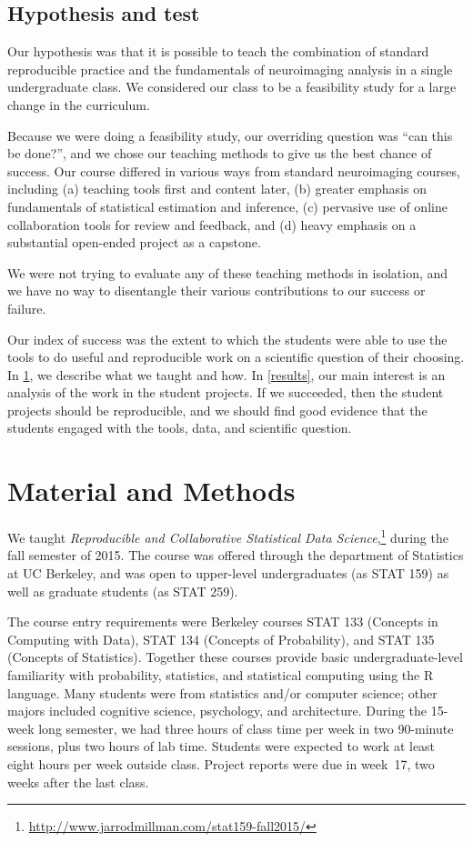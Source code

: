 \subsection{Hypothesis and test}

Our hypothesis was that it is possible to teach the combination of standard
reproducible practice and the fundamentals of neuroimaging analysis in a
single undergraduate class.  We considered our class to be a feasibility study
for a large change in the curriculum.

Because we were doing a feasibility study, our overriding question was ``can
this be done?'', and we chose our teaching methods to give us the best chance
of success.  Our course differed in various ways from standard neuroimaging
courses, including (a) teaching tools first and content later, (b) greater
emphasis on fundamentals of statistical estimation and inference, (c) pervasive
use of online collaboration tools for review and feedback, and (d) heavy
emphasis on a substantial open-ended project as a capstone.

We were not trying to evaluate any of these teaching methods in isolation, and
we have no way to disentangle their various contributions to our success or
failure.

Our index of success was the extent to which the students were able to use the
tools to do useful and reproducible work on a scientific question of their
choosing.  In \ref{methods}, we describe what we taught and how.  In
\ref{results}, our main interest is an analysis of the work in the student
projects.  If we succeeded, then the student projects should be reproducible,
and we should find good evidence that the students engaged with the tools,
data, and scientific question.

\section{Material and Methods}\label{methods}

We taught \emph{Reproducible and Collaborative Statistical Data
Science},\footnote{\url{http://www.jarrodmillman.com/stat159-fall2015/}} during
the fall semester of 2015.  The course was offered through the department of
Statistics at UC Berkeley, and was open to upper-level undergraduates (as STAT
159) as well as graduate students (as STAT 259).

The course entry requirements were Berkeley courses STAT 133 (Concepts in
Computing with Data), STAT 134 (Concepts of Probability), and STAT 135
(Concepts of Statistics).  Together these courses provide basic
undergraduate-level familiarity with probability, statistics, and statistical
computing using the R language.
Many students were from statistics and/or computer science; other majors
included cognitive science, psychology, and architecture.
During the 15-week long semester, we had three hours of class time per week in
two 90-minute sessions, plus two hours of lab time.  Students were expected to
work at least eight hours per week outside class.  Project reports were due in
week~17, two weeks after the last class.

